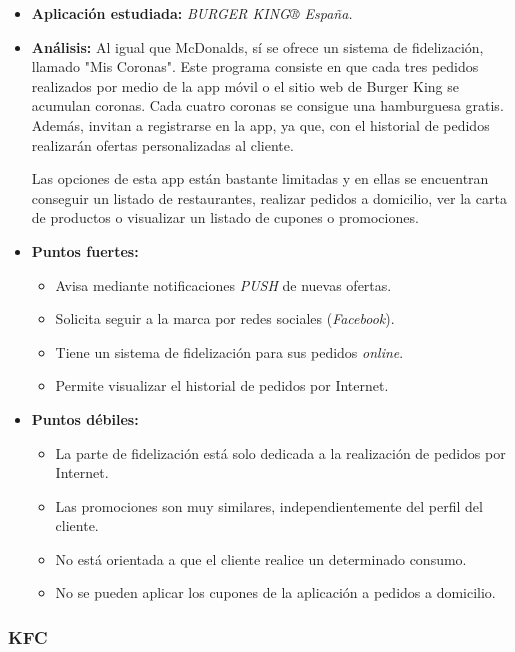 \documentclass[twoside]{report}
\begin{document}
\begin{itemize}
\item \textbf{Aplicación estudiada:} \cite{burgerk} \textit{BURGER KING® España.}
\item \textbf{Análisis:} 
Al igual que McDonalds, sí se ofrece un sistema de fidelización, llamado "Mis Coronas". Este programa consiste en que cada tres pedidos realizados por medio de la app móvil o el sitio web de Burger King se acumulan coronas. Cada cuatro coronas se consigue una hamburguesa gratis. Además, invitan a registrarse en la app, ya que, con el historial de pedidos realizarán ofertas personalizadas al cliente.

Las opciones de esta app están bastante limitadas y en ellas se encuentran conseguir un listado de restaurantes, realizar pedidos a domicilio, ver la carta de productos o visualizar un listado de cupones o promociones.
\item \textbf{Puntos fuertes:}
	\begin{itemize}
	\item Avisa mediante notificaciones \textit{PUSH} de nuevas ofertas.
	\item Solicita seguir a la marca por redes sociales (\textit{Facebook}).
	\item Tiene un sistema de fidelización para sus pedidos \textit{online}.
	\item Permite visualizar el historial de pedidos por Internet.
	\end{itemize}
\item \textbf{Puntos débiles:}
	\begin{itemize}
		\item La parte de fidelización está solo dedicada a la realización de pedidos por Internet.
		\item Las promociones son muy similares, independientemente del perfil del cliente.
		\item No está orientada a que el cliente realice un determinado consumo.
		\item No se pueden aplicar los cupones de la aplicación a pedidos a domicilio.
	\end{itemize}
\end{itemize}

\subsubsection{KFC}
\end{document}
